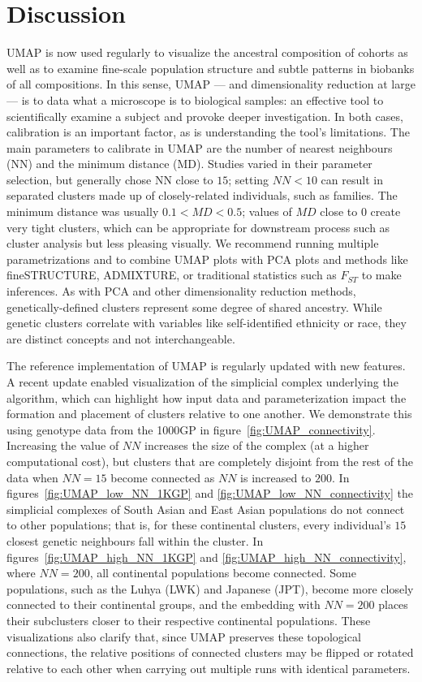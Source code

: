 \documentclass[12pt]{article}
\begin{document}
\section*{Discussion}
UMAP is now used regularly to visualize the ancestral composition of cohorts as well as to examine fine-scale population structure and subtle patterns in biobanks of all compositions. In this sense, UMAP --- and dimensionality reduction at large --- is to data what a microscope is to biological samples: an effective tool to scientifically examine a subject and provoke deeper investigation. In both cases, calibration is an important factor, as is understanding the tool's limitations. The main parameters to calibrate in UMAP are the number of nearest neighbours (NN) and the minimum distance (MD). Studies varied in their parameter selection, but generally chose NN close to $15$; setting $NN < 10$ can result in separated clusters made up of closely-related individuals, such as families. The minimum distance was usually $0.1 < MD < 0.5$; values of $MD$ close to $0$ create very tight clusters, which can be appropriate for  downstream process such as cluster analysis but less pleasing visually. We recommend running multiple parametrizations and to combine UMAP plots with PCA plots and methods like fineSTRUCTURE\cite{lawson2012inference}, ADMIXTURE\cite{alexander2009fast}, or traditional statistics such as $F_{ST}$ to make inferences. As with PCA and other dimensionality reduction methods, genetically-defined clusters represent some degree of shared ancestry. While genetic clusters correlate with variables like self-identified ethnicity or race, they are distinct concepts and not interchangeable\cite{mathieson2020ancestry}.

The reference implementation of UMAP is regularly updated with new features\cite{mcinnes2018software}. A recent update enabled visualization of the simplicial complex underlying the algorithm, which can highlight how input data and parameterization impact the formation and placement of clusters relative to one another. We demonstrate this using genotype data from the 1000GP in figure~\ref{fig:UMAP_connectivity}. Increasing the value of $NN$ increases the size of the complex (at a higher computational cost), but clusters that are completely disjoint from the rest of the data when $NN=15$ become connected as $NN$ is increased to $200$. In figures~\ref{fig:UMAP_low_NN_1KGP} and \ref{fig:UMAP_low_NN_connectivity} the simplicial complexes of South Asian and East Asian populations do not connect to other populations; that is, for these continental clusters, every individual's $15$ closest genetic neighbours fall within the cluster. In figures~\ref{fig:UMAP_high_NN_1KGP} and \ref{fig:UMAP_high_NN_connectivity}, where $NN=200$, all continental populations become connected. Some populations, such as the Luhya (LWK) and Japanese (JPT), become more closely connected to their continental groups, and the embedding with $NN=200$ places their subclusters closer to their respective continental populations. These visualizations also clarify that, since UMAP preserves these topological connections, the relative positions of connected clusters may be flipped or rotated relative to each other when carrying out multiple runs with identical parameters.
\end{document}
